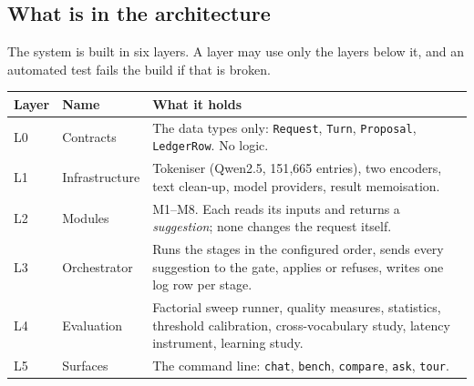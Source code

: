 \documentclass[11pt,a4paper]{article}
\begin{document}
\subsection{What is in the architecture}

The system is built in six layers. A layer may use only the layers below it, and an
automated test fails the build if that is broken.

\begin{tabularx}{\textwidth}{@{}l l X@{}}
\toprule
\textbf{Layer} & \textbf{Name} & \textbf{What it holds} \\
\midrule
L0 & Contracts & The data types only: \texttt{Request}, \texttt{Turn}, \texttt{Proposal}, \texttt{LedgerRow}. No logic. \\
L1 & Infrastructure & Tokeniser (Qwen2.5, 151{,}665 entries), two encoders, text clean-up, model providers, result memoisation. \\
L2 & Modules & M1--M8. Each reads its inputs and returns a \emph{suggestion}; none changes the request itself. \\
L3 & Orchestrator & Runs the stages in the configured order, sends every suggestion to the gate, applies or refuses, writes one log row per stage. \\
L4 & Evaluation & Factorial sweep runner, quality measures, statistics, threshold calibration, cross-vocabulary study, latency instrument, learning study. \\
L5 & Surfaces & The command line: \texttt{chat}, \texttt{bench}, \texttt{compare}, \texttt{ask}, \texttt{tour}. \\
\bottomrule
\end{tabularx}
\end{document}
